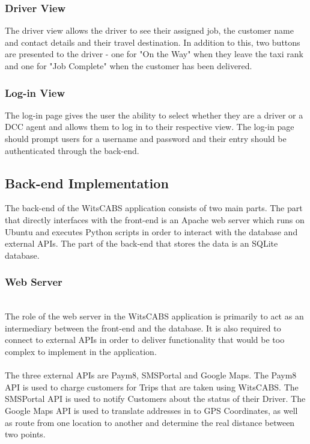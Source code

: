 \documentclass[10pt, onecolumn]{witseiepaper}
\begin{document}
\subsubsection{Driver View}
The driver view allows the driver to see their assigned job, the customer name and contact details and their travel destination. In addition to this, two buttons are presented to the driver - one for "On the Way" when they leave the taxi rank and one for "Job Complete" when the customer has been delivered.
\subsubsection{Log-in View}
The log-in page gives the user the ability to select whether they are a driver or a DCC agent and allows them to log in to their respective view. The log-in page should prompt users for a username and password and their entry should be authenticated through the back-end.

\subsection{Back-end Implementation}
The back-end of the WitsCABS application consists of two main parts. The part that directly interfaces with the front-end is an Apache web server which runs on Ubuntu and executes Python scripts in order to interact with the database and external APIs. The part of the back-end that stores the data is an SQLite database.

\subsubsection{Web Server}\mbox{}\\
The role of the web server in the WitsCABS application is primarily to act as an intermediary between the front-end and the database. It is also required to connect to external APIs in order to deliver functionality that would be too complex to implement in the application.\\ \\
The three external APIs are Paym8, SMSPortal and Google Maps. The Paym8 API is used to charge customers for Trips that are taken using WitsCABS. The SMSPortal API is used to notify Customers about the status of their Driver. The Google Maps API is used to translate addresses in to GPS Coordinates, as well as route from one location to another and determine the real distance between two points.
\end{document}
